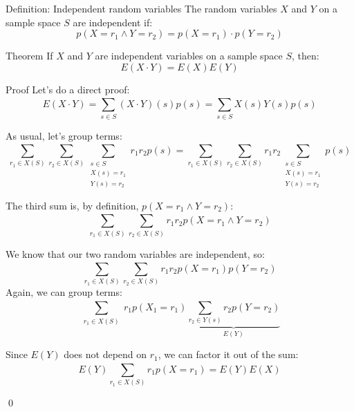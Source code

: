 \documentclass[a4paper]{article}
\begin{document}
\begin{parag}{Definition: Independent random variables}
    The random variables $X$ and $Y$ on a sample space $S$ are independent if: 
    \[p\left(X = r_1 \land Y = r_2\right) = p\left(X = r_1\right)\cdot p\left(Y = r_2\right)\]
    
\end{parag}

\begin{parag}{Theorem}
    If $X$ and $Y$ are independent variables on a sample space $S$, then: 
    \[E\left(X \cdot Y\right) = E\left(X\right) E\left(Y\right)\]
    
    \begin{subparag}{Proof}
        Let's do a direct proof:
        \[E\left(X \cdot Y\right) = \sum_{s \in S}^{} \left(X\cdot Y\right)\left(s\right)p\left(s\right) = \sum_{s \in S}^{} X\left(s\right)Y\left(s\right)p\left(s\right)\]

        As usual, let's group terms:
        \[\sum_{r_1 \in X\left(S\right)}^{}  \sum_{r_2 \in X\left(S\right)}^{} \sum_{\substack{s \in S \\ X\left(s\right) = r_1 \\ Y\left(s\right) = r_2}}^{} r_1 r_2 p\left(s\right) = \sum_{r_1 \in X\left(S\right)}^{}  \sum_{r_2 \in X\left(S\right)}^{} r_1 r_2 \sum_{\substack{s \in S \\ X\left(s\right) = r_1  \\ Y\left(s\right) = r_2}}^{} p\left(s\right)\]

        The third sum is, by definition, $p\left(X = r_1 \land Y = r_2\right)$:
        \[\sum_{r_1 \in X\left(S\right)}^{}  \sum_{r_2 \in X\left(S\right)}^{} r_1 r_2 p\left(X = r_1 \land Y = r_2\right)\]

        We know that our two random variables are independent, so:
        \[\sum_{r_1 \in X\left(S\right)}^{}  \sum_{r_2 \in X\left(S\right)}^{} r_1 r_2 p\left(X = r_1\right) p\left(Y = r_2\right)\]
        Again, we can group terms:
        \[\sum_{\substack{r_1 \in X\left(S\right)}}^{} r_1 p\left(X_1 = r_1\right) \underbrace{\sum_{r_2 \in Y\left(s\right)}^{} r_2 p\left(Y = r_2\right)}_{E\left(Y\right)}\]

        Since $E\left(Y\right)$ does not depend on $r_1$, we can factor it out of the sum:
        \[E\left(Y\right) \sum_{r_1 \in X\left(S\right)}^{} r_1 p\left(X = r_1\right) = E\left(Y\right) E\left(X\right)\]

        \qed
    \end{subparag}
\end{parag}
\end{document}
